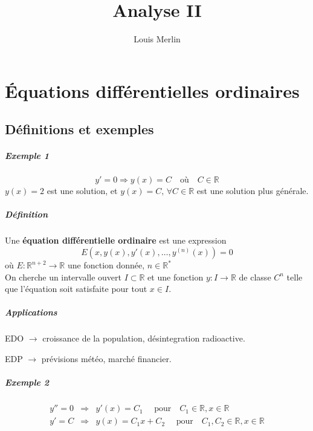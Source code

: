 \documentclass[1Opt]{report}
\author{Louis Merlin}
\begin{document}
\title{Analyse II}
\maketitle

\tableofcontents


\chapter{Équations différentielles ordinaires}

\section{Définitions et exemples}


\paragraph{Exemple 1}
\[y'=0 \Rightarrow y(x)=C \quad \mbox{où} \quad C\in{\mathbb R}\]
$y(x)=2$ est une solution, et $y(x)=C,\,\forall C\in{\mathbb R}$ est une solution
plus générale.

\paragraph{Définition}
Une \textbf{équation différentielle ordinaire} est une expression
\[ E(x,y(x),y'(x),\ldots,y^{(n)}(x))=0\]
où $E:{\mathbb R}^{n+2}\rightarrow{\mathbb R}$ une fonction donnée,
$n\in{\mathbb R}^\ast$\\
On cherche un intervalle ouvert $I\subset{\mathbb R}$ et une fonction
$y:I\rightarrow{\mathbb R}$ de classe $C^n$ telle que l'équation soit satisfaite
pour tout $x\in I$.

\paragraph{Applications}
\begin{description}
  \item EDO $\rightarrow$ croissance de la population, désintegration radioactive.
  \item EDP $\rightarrow$ prévisions météo, marché financier.
\end{description}

\paragraph{Exemple 2}
\begin{eqnarray*}
   y''=0 & \Rightarrow & y'(x)=C_1\quad \mbox{ pour} \quad C_1\in{\mathbb R}, x\in{\mathbb R} \\
   y'=C & \Rightarrow & y(x)=C_1x+C_2\quad \mbox{ pour} \quad C_1,C_2\in{\mathbb R},x\in{\mathbb R}
\end{eqnarray*}
\end{document}
